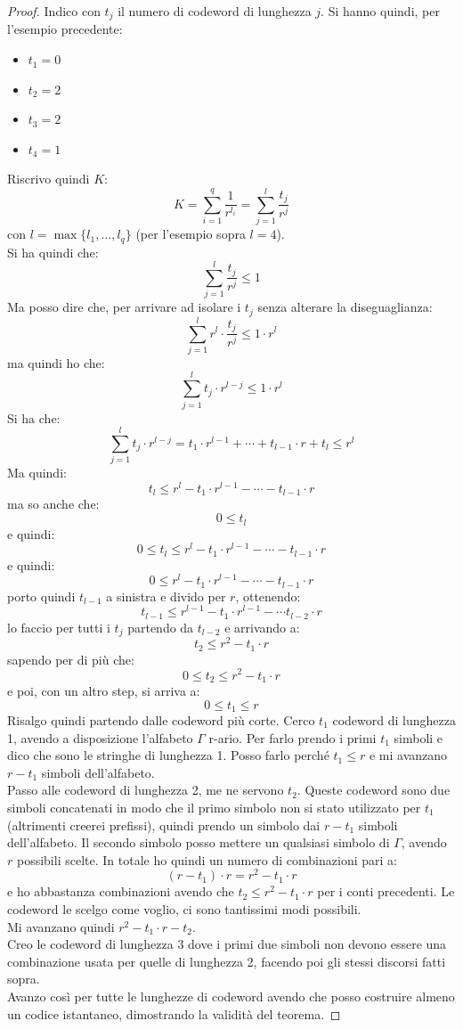 \documentclass[a4paper,12pt, oneside]{book}
\begin{document}
\begin{proof}
  Indico con $t_j$ il numero di codeword di lunghezza $j$. Si hanno quindi, per
  l'esempio precedente:
  \begin{itemize}
    \item $t_1=0$
    \item $t_2=2$
    \item $t_3=2$
    \item $t_4=1$
  \end{itemize}
  Riscrivo quindi $K$:
  \[K=\sum_{i=1}^q\frac{1}{r^{l_i}}=\sum_{j=1}^l\frac{t_j}{r^{j}}\]
  con $l=\max\{l_1,\ldots,l_q\}$ (per l'esempio sopra $l=4$).\\
  Si ha quindi che:
  \[\sum_{j=1}^l\frac{t_j}{r^{j}}\leq 1\]
  Ma posso dire che, per arrivare ad isolare i $t_j$ senza alterare la
  diseguaglianza: 
  \[\sum_{j=1}^lr^l\cdot\frac{t_j}{r^{j}}\leq 1\cdot r^l\]
  ma quindi ho che:
  \[\sum_{j=1}^lt_j\cdot r^{l-j}\leq 1\cdot r^l\]
  Si ha che:
  \[ \sum_{j=1}^lt_j\cdot r^{l-j}= t_1\cdot r^{l-1}+\cdots+t_{l-1}\cdot
    r+t_l\leq r^l\]
  Ma quindi:
  \[t_l\leq r^l- t_1\cdot r^{l-1}-\cdots-t_{l-1}\cdot r\]
  ma so anche che:
  \[0\leq t_l\]
  e quindi:
  \[0\leq t_l\leq r^l- t_1\cdot r^{l-1}-\cdots-t_{l-1}\cdot r\]
  e quindi:
  \[0\leq r^l- t_1\cdot r^{l-1}-\cdots-t_{l-1}\cdot r\]
  porto quindi $t_{l-1}$ a sinistra e divido per $r$, ottenendo:
  \[t_{l-1}\leq r^{l-1}-t_1\cdot r^{l-1}-\cdots t_{l-2}\cdot r\]
  lo faccio per tutti i $t_j$ partendo da $t_{l-2}$ e arrivando a:
  \[t_2\leq r^2-t_1\cdot r\]
  sapendo per di più che:
  \[0\leq t_2\leq r^2-t_1\cdot r\]
  e poi, con un altro step, si arriva a:
  \[0\leq t_1\leq r\]
  Risalgo quindi partendo dalle codeword più corte. Cerco $t_1$ codeword di
  lunghezza 1, avendo a disposizione l'alfabeto $\Gamma$ r-ario. Per farlo
  prendo i primi $t_1$ simboli e dico che sono le stringhe di lunghezza 1. Posso
  farlo perché $t_1\leq r$ e mi avanzano $r-t_1$ simboli dell'alfabeto.\\
  Passo alle codeword di lunghezza 2, me ne servono $t_2$. Queste codeword sono
  due simboli concatenati in modo che il primo simbolo non si stato utilizzato
  per $t_1$ (altrimenti creerei prefissi), quindi prendo un simbolo dai $r-t_1$
  simboli dell'alfabeto. Il secondo simbolo posso mettere un qualsiasi simbolo
  di $\Gamma$, avendo $r$ possibili scelte. In totale ho quindi un numero di
  combinazioni pari a:
  \[(r-t_1)\cdot r=r^2-t_1\cdot r\]
  e ho abbastanza combinazioni avendo che $t_2\leq r^2-t_1\cdot r$ per i conti
  precedenti. Le codeword le scelgo come voglio, ci sono tantissimi modi
  possibili.\\  
  Mi avanzano quindi $r^2-t_1\cdot r-t_2$.\\
  Creo le codeword di lunghezza 3 dove i primi due simboli non devono essere una
  combinazione usata per quelle di lunghezza 2, facendo poi gli stessi discorsi
  fatti sopra. \\
  Avanzo così per tutte le lunghezze di codeword avendo che posso costruire
  almeno un codice istantaneo, dimostrando la validità del teorema.
\end{proof}
\end{document}
